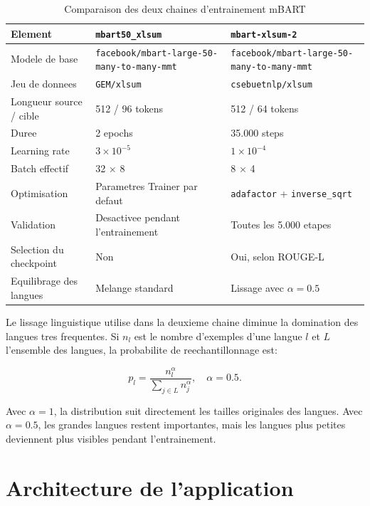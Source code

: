 \begin{table}[t]
\caption{Comparaison des deux chaines d'entrainement mBART}
\label{tab:mbart-training-numeric}
\centering
\begin{tabular}{|p{4.0cm}|p{4.4cm}|p{4.4cm}|}
\hline
\textbf{Element} & \textbf{\texttt{mbart50\_xlsum}} & \textbf{\texttt{mbart-xlsum-2}} \\
\hline
Modele de base & \texttt{facebook/mbart-large-50-many-to-many-mmt} & \texttt{facebook/mbart-large-50-many-to-many-mmt} \\
\hline
Jeu de donnees & \texttt{GEM/xlsum} & \texttt{csebuetnlp/xlsum} \\
\hline
Longueur source / cible & 512 / 96 tokens & 512 / 64 tokens \\
\hline
Duree & 2 epochs & 35.000 steps \\
\hline
Learning rate & $3 \times 10^{-5}$ & $1 \times 10^{-4}$ \\
\hline
Batch effectif & 32 $\times$ 8 & 8 $\times$ 4 \\
\hline
Optimisation & Parametres Trainer par defaut & \texttt{adafactor} + \texttt{inverse\_sqrt} \\
\hline
Validation & Desactivee pendant l'entrainement & Toutes les 5.000 etapes \\
\hline
Selection du checkpoint & Non & Oui, selon ROUGE-L \\
\hline
Equilibrage des langues & Melange standard & Lissage avec $\alpha=0.5$ \\
\hline
\end{tabular}
\end{table}

Le lissage linguistique utilise dans la deuxieme chaine diminue la domination des langues tres frequentes. Si $n_l$ est le nombre d'exemples d'une langue $l$ et $L$ l'ensemble des langues, la probabilite de reechantillonnage est:

\begin{equation}
p_l = \frac{n_l^{\alpha}}{\sum_{j \in L} n_j^{\alpha}},
\quad \alpha = 0.5.
\label{eq:application-language-smoothing}
\end{equation}

Avec $\alpha=1$, la distribution suit directement les tailles originales des langues. Avec $\alpha=0.5$, les grandes langues restent importantes, mais les langues plus petites deviennent plus visibles pendant l'entrainement.

\section{Architecture de l'application}

